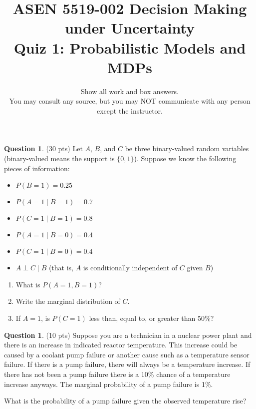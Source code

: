 \documentclass{article}
\title{ASEN 5519-002 Decision Making under Uncertainty\\
       Quiz 1: Probabilistic Models and MDPs}
\date{\small Show all work and box answers.\\
You may consult any source, but you may NOT communicate with any person except the instructor.}
\theoremstyle{definition}
\newtheorem{question}[thm]{Question}
\begin{document}
\maketitle

\begin{question} (30 pts)
    Let $A$, $B$, and $C$ be three binary-valued random variables (binary-valued means the support is $\{0,1\}$). Suppose we know the following pieces of information:
    \begin{itemize}[nosep]
        \item $P(B=1) = 0.25$
        \item $P(A=1 \mid B=1) = 0.7$
        \item $P(C=1 \mid B=1) = 0.8$
        \item $P(A=1 \mid B=0) = 0.4$
        \item $P(C=1 \mid B=0) = 0.4$
        \item $A \perp C \mid B$ (that is, $A$ is conditionally independent of $C$ given $B$)
    \end{itemize}

    \begin{enumerate}[label=\alph*),noitemsep]
        \item What is $P(A=1, B=1)$?
        \item Write the marginal distribution of $C$.
        \item If $A=1$, is $P(C=1)$ less than, equal to, or greater than 50\%?
    \end{enumerate}
\end{question}

\begin{question} (10 pts)
    Suppose you are a technician in a nuclear power plant and there is an increase in indicated reactor temperature. This increase could be caused by a coolant pump failure or another cause such as a temperature sensor failure. If there is a pump failure, there will always be a temperature increase. If there has not been a pump failure there is a 10\% chance of a temperature increase anyways. The marginal probability of a pump failure is 1\%.

    What is the probability of a pump failure given the observed temperature rise?
\end{question}
\end{document}
